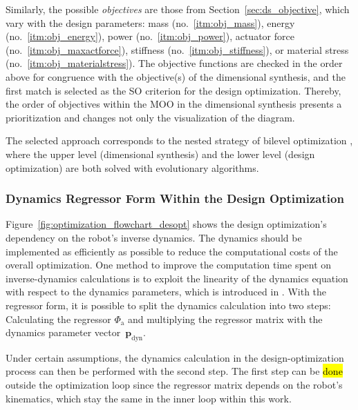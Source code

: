 Similarly, the possible \emph{objectives} are those from Section~\ref{sec:ds_objective}, which vary with the design parameters: mass (no.~\ref{itm:obj_mass}), energy (no.~\ref{itm:obj_energy}), power (no.~\ref{itm:obj_power}), actuator force (no.~\ref{itm:obj_maxactforce}), stiffness (no.~\ref{itm:obj_stiffness}), or material stress (no.~\ref{itm:obj_materialstress}).
The objective functions are checked in the order above for congruence with the objective(s) of the dimensional synthesis, and the first match is selected as the SO criterion for the design optimization.
Thereby, the order of objectives within the MOO in the dimensional synthesis presents a prioritization and changes not only the visualization of the  diagram.

The selected approach corresponds to the nested strategy of bilevel optimization \cite{SinhaMalDeb2017}, where the upper level (dimensional synthesis) and the lower level (design optimization) are both solved with evolutionary algorithms.
%

%
%
%
%
%
%
%
%


\subsubsection{Dynamics Regressor Form Within the Design Optimization}
\label{sec:dyn_reg_dimsynth}

Figure~\ref{fig:optimization_flowchart_desopt} shows the design optimization's dependency on the robot's inverse dynamics.
%
The dynamics should be implemented as efficiently as possible to reduce the computational costs of the overall optimization.
%
One method to improve the computation time spent on inverse-dynamics calculations is to exploit the linearity of the dynamics equation with respect to the dynamics parameters, which is introduced in \cite{SchapplerTapOrt2019b}.
With the regressor form, it is possible to split the dynamics calculation into two steps: Calculating the regressor $\bm{\varPhi}_{\mathrm{a}}$ and multiplying the regressor matrix with the dynamics parameter vector~$\bm{p}_{\mathrm{dyn}}$.
%

Under certain assumptions, the dynamics calculation in the design-optimization process can then be performed with the second step.
The first step can be \hl{done} outside the optimization loop since the regressor matrix depends on the robot's kinematics, which stay the same in the inner loop within this work. %

